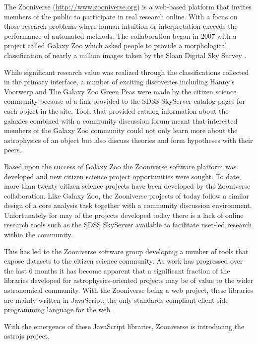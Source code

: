 \documentclass[11pt,twoside]{article}
\begin{document}
The Zooniverse (\url{http://www.zooniverse.org}) is a web-based platform that invites members of the public to participate in real research online. With a focus on those research problems where human intuition or interpretation exceeds the performance of automated methods. The collaboration began in 2007 with a project called Galaxy Zoo \citep{2007AAS...211.9403R} which asked people to provide a morphological classification of nearly a million images taken by the Sloan Digital Sky Survey \citep{2000AJ....120.1579Y}.

While significant research value was realized through the classifications collected in the primary interface, a number of exciting discoveries including Hanny's Voorwerp \citep{2009MNRAS.399..129L} and The Galaxy Zoo Green Peas \citep{2009MNRAS.399.1191C} were made by the citizen science community because of a link provided to the SDSS SkyServer \citep{2002cs........2013S} catalog pages for each object in the site. Tools that provided catalog information about the galaxies combined with a community discussion forum meant that interested members of the Galaxy Zoo community could not only learn more about the astrophysics of an object but also discuss theories and form hypotheses with their peers.

Based upon the success of Galaxy Zoo the Zooniverse software platform was developed and new citizen science project opportunities were sought. To date, more than twenty citizen science projects have been developed by the Zooniverse collaboration. Like Galaxy Zoo, the Zooniverse projects of today follow a similar design of a core analysis task together with a community discussion environment. Unfortunately for may of the projects developed today there is a lack of online research tools such as the SDSS SkyServer available to facilitate user-led research within the community.

This has led to the Zooniverse software group developing a number of tools that expose datasets to the citizen science community. As work has progressed over the last 6 months it has become apparent that a significant fraction of the libraries developed for astrophysics-oriented projects may be of value to the wider astronomical community. With the Zooniverse being a web project, these libraries are mainly written in JavaScript; the only standards compliant client-side programming language for the web.

With the emergence of these JavaScript libraries, Zooniverse is introducing the astrojs project.
\end{document}
